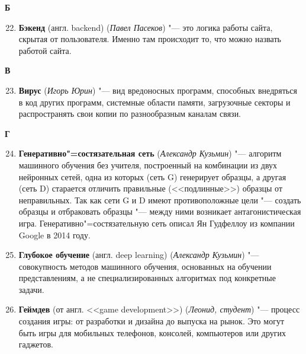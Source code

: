 \begin{flushleft} \large\textbf{Б} \end{flushleft}

\begin{enumerate}
\setcounter{enumi}{21}
\item \textbf{Бэкенд} (англ. backend) (\textit{Павел Пасеков}) "--- 
    это логика работы сайта, скрытая от пользователя. Именно там происходит то, что можно назвать работой сайта.
\end{enumerate}

\begin{flushleft} \large\textbf{В} \end{flushleft}

\begin{enumerate}
\setcounter{enumi}{22}
\item \textbf{Вирус} (\textit{Игорь Юрин}) "--- 
    вид вредоносных программ, способных внедряться в код других программ, системные области памяти, загрузочные секторы и распространять свои копии по разнообразным каналам связи.
\end{enumerate}

\begin{flushleft} \large\textbf{Г} \end{flushleft}

\begin{enumerate}
\setcounter{enumi}{23}
\item \textbf{Генеративно"=состязательная сеть} (\textit{Александр Кузьмин}) "---
     алгоритм машинного обучения без учителя, построенный на комбинации из двух нейронных сетей, одна из которых (сеть G) генерирует образцы, а другая (сеть D) старается отличить правильные (<<подлинные>>) образцы от неправильных. Так как сети G и D имеют противоположные цели "--- создать образцы и отбраковать образцы "--- между ними возникает антагонистическая игра. Генеративно"=состязательную сеть описал Ян Гудфеллоу из компании Google в 2014 году.
     
\item \textbf{Глубокое обучение} (англ. deep learning) (\textit{Александр Кузьмин}) "---
     совокупность методов машинного обучения, основанных на обучении представлениям, а не специализированных алгоритмах под конкретные задачи.

\item \textbf{Геймдев} (от англ. <<game development>>) (\textit{Леонид, студент}) "---
     процесс создания игры: от разработки и дизайна до выпуска на рынок. Это могут быть игры для мобильных телефонов, консолей, компьютеров или других гаджетов.
     

\end{enumerate}

